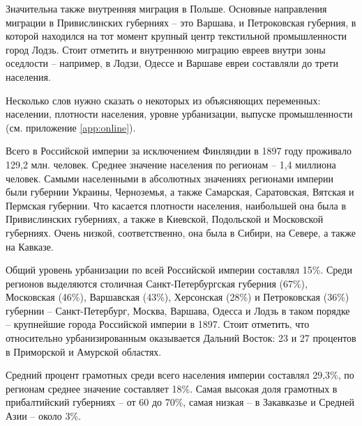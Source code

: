 \documentclass[a4paper,12pt]{article}
\begin{document}
Значительна также внутренняя миграция в Польше. Основные направления миграции в Привислинских губерниях – это Варшава, и Петроковская губерния, в которой находился на тот момент крупный центр текстильной промышленности город Лодзь. Стоит отметить и внутреннюю миграцию евреев внутри зоны оседлости – например, в Лодзи, Одессе и Варшаве евреи составляли до трети населения.

Несколько слов нужно сказать о некоторых из объясняющих переменных: населении, плотности населения, уровне урбанизации, выпуске промышленности (см. приложение \ref{app:online}).

Всего в Российской империи за исключением Финляндии в 1897 году проживало 129,2 млн. человек. Среднее значение населения по регионам – 1,4 миллиона человек. Самыми населенными в абсолютных значениях регионами империи были губернии Украины, Черноземья, а также Самарская, Саратовская, Вятская и Пермская губернии. Что касается плотности населения, наибольшей она была в Привислинских губерниях, а также в Киевской, Подольской и Московской губерниях. Очень низкой, соответственно, она была в Сибири, на Севере, а также на Кавказе. 

Общий уровень урбанизации по всей Российской империи составлял 15\%. Среди регионов выделяются столичная Санкт-Петербургская губерния (67\%), Московская (46\%), Варшавская (43\%), Херсонская (28\%) и Петроковская (36\%) губернии – Санкт-Петербург, Москва, Варшава, Одесса и Лодзь в таком порядке – крупнейшие города Российской империи в 1897. Стоит отметить, что относительно урбанизированным оказывается Дальний Восток: 23 и 27 процентов в Приморской и Амурской областях. 

Средний процент грамотных среди всего населения империи составлял 29,3\%, по регионам среднее значение составляет 18\%. Самая высокая доля грамотных в прибалтийский губерниях – от 60 до 70\%, самая низкая – в Закавказье и Средней Азии – около 3\%.
\end{document}
